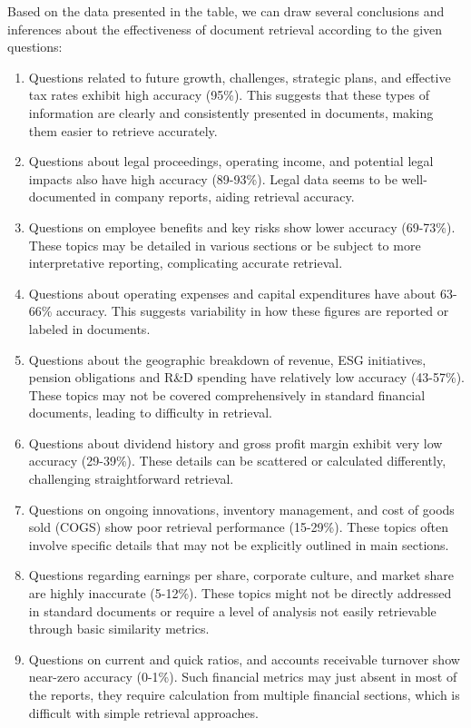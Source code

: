 Based on the data presented in the table, we can draw several conclusions and inferences about the effectiveness of document retrieval according to the given questions:
\begin{enumerate}
\item Questions related to future growth, challenges, strategic plans, and effective tax rates exhibit high accuracy (95\%). This suggests that these types of information are clearly and consistently presented in documents, making them easier to retrieve accurately.
\item Questions about legal proceedings, operating income, and potential legal impacts also have high accuracy (89-93\%). Legal data seems to be well-documented in company reports, aiding retrieval accuracy.
\item Questions on employee benefits and key risks show lower accuracy (69-73\%). These topics may be detailed in various sections or be subject to more interpretative reporting, complicating accurate retrieval. 
\item Questions about operating expenses and capital expenditures have about 63-66\% accuracy. This suggests variability in how these figures are reported or labeled in documents.
\item Questions about the geographic breakdown of revenue, ESG initiatives, pension obligations and R\&D spending have relatively low accuracy (43-57\%). These topics may not be covered comprehensively in standard financial documents, leading to difficulty in retrieval.
\item Questions about dividend history and gross profit margin exhibit very low accuracy (29-39\%). These details can be scattered or calculated differently, challenging straightforward retrieval.
\item Questions on ongoing innovations, inventory management, and cost of goods sold (COGS) show poor retrieval performance (15-29\%). These topics often involve specific details that may not be explicitly outlined in main sections.
\item Questions regarding earnings per share, corporate culture, and market share are highly inaccurate (5-12\%). These topics might not be directly addressed in standard documents or require a level of analysis not easily retrievable through basic similarity metrics.
\item Questions on current and quick ratios, and accounts receivable turnover show near-zero accuracy (0-1\%). Such financial metrics may just absent in most of the reports, they require calculation from multiple financial sections, which is difficult with simple retrieval approaches.
\end{enumerate}

